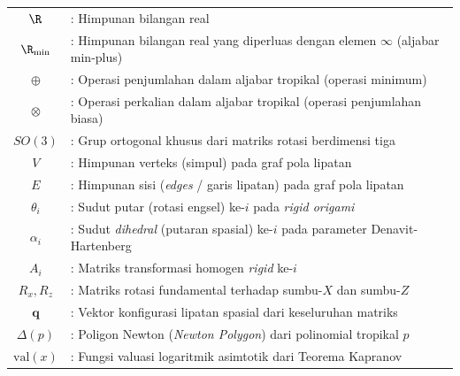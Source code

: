 \renewcommand{\arraystretch}{1.4}
\begin{tabular}{c l}
        $\R$          & : Himpunan bilangan real \\
        $\R_{\min}$   & : Himpunan bilangan real yang diperluas dengan elemen $\infty$ (aljabar min-plus) \\
        $\oplus$      & : Operasi penjumlahan dalam aljabar tropikal (operasi minimum) \\
        $\otimes$     & : Operasi perkalian dalam aljabar tropikal (operasi penjumlahan biasa) \\
        $SO(3)$       & : Grup ortogonal khusus dari matriks rotasi berdimensi tiga \\
        $V$           & : Himpunan verteks (simpul) pada graf pola lipatan \\
        $E$           & : Himpunan sisi (\textit{edges} / garis lipatan) pada graf pola lipatan \\
        $\theta_i$    & : Sudut putar (rotasi engsel) ke-$i$ pada \textit{rigid origami} \\
        $\alpha_i$    & : Sudut \textit{dihedral} (putaran spasial) ke-$i$ pada parameter Denavit-Hartenberg \\
        $A_i$         & : Matriks transformasi homogen \textit{rigid} ke-$i$ \\
        $R_x, R_z$    & : Matriks rotasi fundamental terhadap sumbu-$X$ dan sumbu-$Z$ \\
        $\mathbf{q}$  & : Vektor konfigurasi lipatan spasial dari keseluruhan matriks \\
        $\Delta(p)$   & : Poligon Newton (\textit{Newton Polygon}) dari polinomial tropikal $p$ \\
        $\mathrm{val}(x)$ & : Fungsi valuasi logaritmik asimtotik dari Teorema Kapranov \\
\end{tabular}